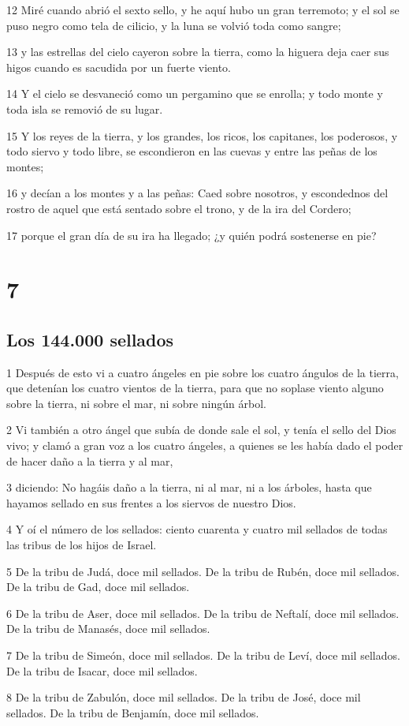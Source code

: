 \par 12 Miré cuando abrió el sexto sello, y he aquí hubo un gran terremoto; y el sol se puso negro como tela de cilicio, y la luna se volvió toda como sangre;
\par 13 y las estrellas del cielo cayeron sobre la tierra, como la higuera deja caer sus higos cuando es sacudida por un fuerte viento.
\par 14 Y el cielo se desvaneció como un pergamino que se enrolla; y todo monte y toda isla se removió de su lugar.
\par 15 Y los reyes de la tierra, y los grandes, los ricos, los capitanes, los poderosos, y todo siervo y todo libre, se escondieron en las cuevas y entre las peñas de los montes;
\par 16 y decían a los montes y a las peñas: Caed sobre nosotros, y escondednos del rostro de aquel que está sentado sobre el trono, y de la ira del Cordero;
\par 17 porque el gran día de su ira ha llegado; ¿y quién podrá sostenerse en pie?

\chapter{7}

\section*{Los 144.000 sellados}

\par 1 Después de esto vi a cuatro ángeles en pie sobre los cuatro ángulos de la tierra, que detenían los cuatro vientos de la tierra, para que no soplase viento alguno sobre la tierra, ni sobre el mar, ni sobre ningún árbol.
\par 2 Vi también a otro ángel que subía de donde sale el sol, y tenía el sello del Dios vivo; y clamó a gran voz a los cuatro ángeles, a quienes se les había dado el poder de hacer daño a la tierra y al mar,
\par 3 diciendo: No hagáis daño a la tierra, ni al mar, ni a los árboles, hasta que hayamos sellado en sus frentes a los siervos de nuestro Dios.
\par 4 Y oí el número de los sellados: ciento cuarenta y cuatro mil sellados de todas las tribus de los hijos de Israel.
\par 5 De la tribu de Judá, doce mil sellados. De la tribu de Rubén, doce mil sellados. De la tribu de Gad, doce mil sellados.
\par 6 De la tribu de Aser, doce mil sellados. De la tribu de Neftalí, doce mil sellados. De la tribu de Manasés, doce mil sellados.
\par 7 De la tribu de Simeón, doce mil sellados. De la tribu de Leví, doce mil sellados. De la tribu de Isacar, doce mil sellados.
\par 8 De la tribu de Zabulón, doce mil sellados. De la tribu de José, doce mil sellados. De la tribu de Benjamín, doce mil sellados.

